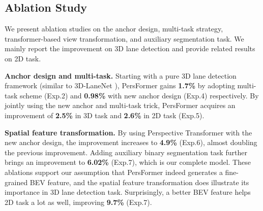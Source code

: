 \documentclass[runningheads]{llncs}
\begin{document}
\subsection{Ablation Study}
We present ablation studies on the anchor design, multi-task strategy, transformer-based view transformation, and auxiliary segmentation task.
We mainly report the improvement on 3D lane detection and provide related results on 2D task.


\textbf{Anchor design and multi-task.}
Starting with a pure 3D lane detection framework (similar to 3D-LaneNet \cite{Garnett_2019_ICCV}), PersFormer gains \textbf{1.7\%} by adopting multi-task scheme (Exp.2) and \textbf{0.98\%} with new anchor design (Exp.4) respectively.
By jointly using the new anchor and multi-task trick, PersFormer acquires an improvement of \textbf{2.5\%} in 3D task and \textbf{2.6\%} in 2D task (Exp.5).

\textbf{Spatial feature transformation.}
By using Perspective Transformer with the new anchor design, the improvement increases to \textbf{4.9\%} (Exp.6), almost doubling the previous improvement.
Adding auxiliary binary segmentation task further brings an improvement to \textbf{6.02\%} (Exp.7), which is our complete model.
These ablations support our assumption that PersFormer indeed generates a fine-grained BEV feature, and the spatial feature transformation does illustrate its importance in 3D lane detection task.
Surprisingly, a better BEV feature helps 2D task a lot as well, improving \textbf{9.7\%} (Exp.7).
\end{document}
